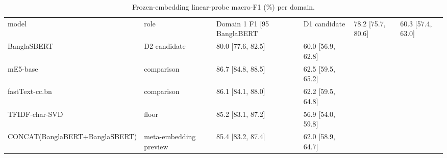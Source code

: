 \begin{table}
\caption{Frozen-embedding linear-probe macro-F1 (\%) per domain.}
\label{tab:domain}
\begin{tabular}{llll}
\toprule
model & role & Domain 1 F1 [95%
\midrule
BanglaBERT & D1 candidate & 78.2 [75.7, 80.6] & 60.3 [57.4, 63.0] \\
BanglaSBERT & D2 candidate & 80.0 [77.6, 82.5] & 60.0 [56.9, 62.8] \\
mE5-base & comparison & 86.7 [84.8, 88.5] & 62.5 [59.5, 65.2] \\
fastText-cc.bn & comparison & 86.1 [84.1, 88.0] & 62.2 [59.5, 64.8] \\
TFIDF-char-SVD & floor & 85.2 [83.1, 87.2] & 56.9 [54.0, 59.8] \\
CONCAT(BanglaBERT+BanglaSBERT) & meta-embedding preview & 85.4 [83.2, 87.4] & 62.0 [58.9, 64.7] \\
\bottomrule
\end{tabular}
\end{table}
